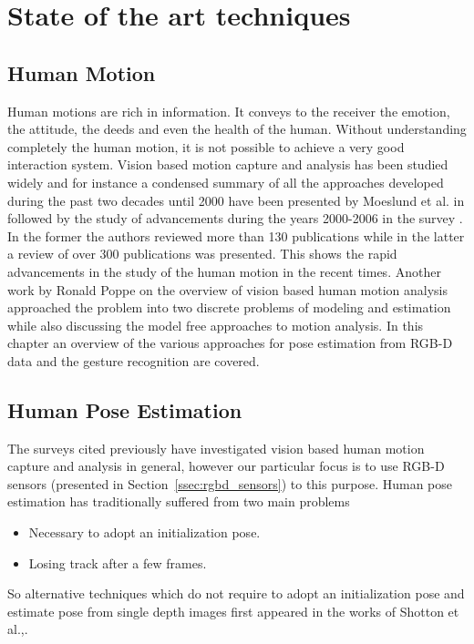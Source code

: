 \chapter{State of the art techniques}
\section{Human Motion} %

\label{Chapter3} %


 Human motions are rich in information. It conveys to the receiver the emotion, the attitude, the deeds and even the health of the human. Without understanding completely the human motion, it is not possible to achieve a very good interaction system.  Vision based motion capture and analysis has been studied widely and for instance a condensed summary of all the approaches developed during the past two decades until 2000 have been presented by Moeslund et al. in \cite{Moeslund2001231} followed by the study of advancements during the years 2000-2006 in the survey \cite{Moeslund200690}. In the former the authors reviewed more than 130 publications while in the latter a review of over 300 publications was presented. This shows the rapid advancements in the study of the human motion in the recent times. Another work by Ronald Poppe\cite{Poppe20074} on the overview of vision based human motion analysis approached the problem into two discrete problems of modeling and estimation while also discussing the model free approaches to motion analysis. In this chapter an overview of the various approaches for pose estimation from RGB-D data and the gesture recognition are covered.
\section{Human Pose Estimation}
\label{sec:humanpose}
  The surveys\cite{Moeslund2001231}\cite{Moeslund200690}\cite{Poppe20074} cited previously have investigated vision based human motion capture and analysis in general, however our particular focus is to use RGB-D sensors (presented in Section~\ref{ssec:rgbd_sensors}) to this purpose. Human pose estimation has traditionally suffered from two main problems
\begin{itemize}
\item Necessary to adopt an initialization pose.
\item Losing track after a few frames.
\end{itemize}
So alternative techniques which do not require to adopt an initialization pose and estimate pose from single depth images first appeared in the works of Shotton et al.,\cite{shotton2013real}.
